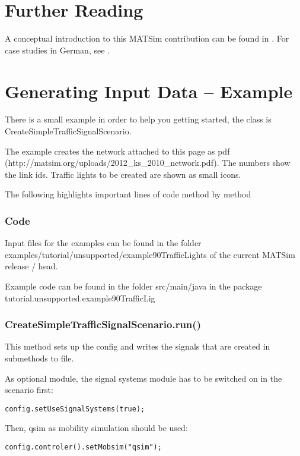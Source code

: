 \section{Further Reading}

A conceptual introduction to this MATSim contribution can be found in \cite{Grether2014PhD}. 
For case studies in German, see \cite{Bischoff2010BaSylvia,Neumann2008DA,Roeder2010BachelorGershenson}.

\section{Generating Input Data -- Example}

There is a small example in order to help you getting started, the class is CreateSimpleTrafficSignalScenario.

The example creates the network attached to this page as pdf (http://matsim.org/uploads/2012\_ks\_2010\_network.pdf). The numbers show the link ids. Traffic lights to be created are shown as small icons.

The following highlights important lines of code method by method

\subsubsection{Code}

Input files for the examples can be found in the folder examples/tutorial/unsupported/example90TrafficLights of the current MATSim release / head.

Example code can be found in the folder src/main/java in the package tutorial.unsupported.example90TrafficLig

\subsubsection{CreateSimpleTrafficSignalScenario.run()}

This method sets up the config and writes the signals that are created in submethods to file.

As optional module, the signal systems module has to be switched on in the scenario first:


\texttt{\nolinebreak config.setUseSignalSystems(true);}

Then, qsim as mobility simulation should be used:


\texttt{\nolinebreak config.controler().setMobsim("qsim"); \nolinebreak }


